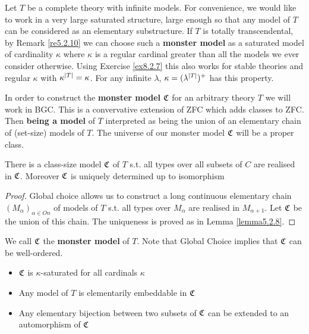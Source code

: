 \documentclass[11pt]{article}
\begin{document}
Let \(T\) be a complete theory with infinite models. For convenience, we would like to work in a
very large saturated structure, large enough so that any model of \(T\) can be considered as an
elementary substructure. If \(T\) is totally transcendental, by Remark \ref{re5.2.10} we can
choose such a \textbf{monster model} as a saturated model of cardinality \(\kappa\) where \(\kappa\) is a regular cardinal
greater than all the models we ever consider otherwise. Using Exercise \ref{ex8.2.7} this also
works for stable theories and regular \(\kappa\) with \(\kappa^{\abs{T}}=\kappa\). For any infinite
\(\lambda\), \(\kappa=(\lambda^{\abs{T}})^+\) has this property.

In order to construct the \textbf{monster model} \(\mathfrak{C}\) for an arbitrary theory \(T\) we will work in BGC.
This is a convervative extension of ZFC which adds classes to ZFC. Then \textbf{being a model} of \(T\)
interpreted as being the union of an elementary chain of (set-size) models of \(T\). The universe
of our monster model \(\mathfrak{C}\) will be a proper class.

\begin{theorem}[BGC]
There is a class-size model \(\mathfrak{C}\) of \(T\) s.t. all types over all subsets of \(C\) are realised
in \(\mathfrak{C}\). Moreover \(\mathfrak{C}\) is uniquely determined up to isomorphism
\end{theorem}

\begin{proof}
Global choice allows us to construct a long continuous elementary chain \((M_\alpha)_{\alpha\in On}\) of
models of \(T\) s.t. all types over \(M_\alpha\) are realised in \(M_{\alpha+1}\). Let \(\mathfrak{C}\) be the union
of this chain. The uniqueness is proved as in Lemma \ref{lemma5.2.8}.
\end{proof}

We call \(\mathfrak{C}\) the \textbf{monster model} of \(T\). Note that Global Choice implies that \(\mathfrak{C}\) can be
well-ordered.

\begin{corollary}[]
\begin{itemize}
\item \(\mathfrak{C}\) is \(\kappa\)-saturated for all cardinals \(\kappa\)
\item Any model of \(T\) is elementarily embeddable in \(\mathfrak{C}\)
\item Any elementary bijection between two subsets of \(\mathfrak{C}\) can be extended to an automorphism of \(\mathfrak{C}\)
\end{itemize}
\end{corollary}
\end{document}
